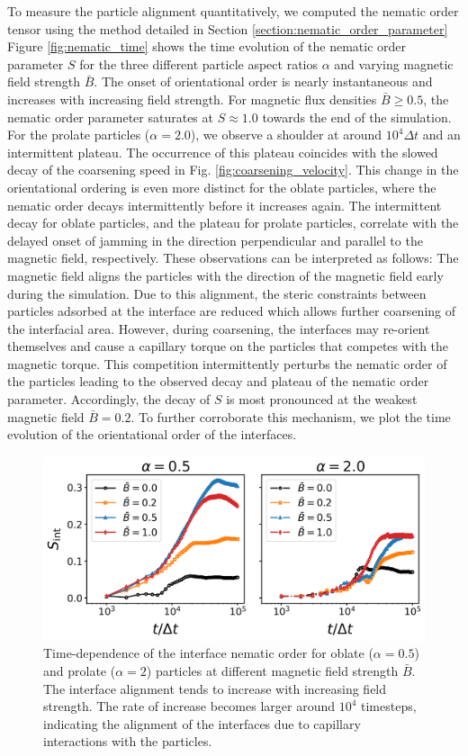 To measure the particle alignment quantitatively, we computed the
nematic order tensor using the method detailed in Section \ref{section:nematic_order_parameter} 
Figure \ref{fig:nematic_time} shows the time evolution of the nematic
order parameter \(S\) for the three different particle aspect ratios
\(\alpha\) and varying magnetic field strength \(\bar{B}\). The onset of
orientational order is nearly instantaneous and increases with
increasing field strength. For magnetic flux densities
\(\bar{B}\ge0.5\), the nematic order parameter saturates at
\(S\approx 1.0\) towards the end of the simulation. For the prolate
particles (\(\alpha=2.0\)), we observe a shoulder at around
\(10^4\Delta t\) and an intermittent plateau. The occurrence of this
plateau coincides with the slowed decay of the coarsening speed in Fig.
\ref{fig:coarsening_velocity}. This change in the orientational ordering
is even more distinct for the oblate particles, where the nematic order
decays intermittently before it increases again. The intermittent decay
for oblate particles, and the plateau for prolate particles, correlate
with the delayed onset of jamming in the direction perpendicular and
parallel to the magnetic field, respectively. These observations can be
interpreted as follows: The magnetic field aligns the particles with the
direction of the magnetic field early during the simulation. Due to this
alignment, the steric constraints between particles adsorbed at the
interface are reduced which allows further coarsening of the interfacial
area. However, during coarsening, the interfaces may re-orient
themselves and cause a capillary torque on the particles that competes
with the magnetic torque. This competition intermittently perturbs the
nematic order of the particles leading to the observed decay and plateau
of the nematic order parameter. Accordingly, the decay of \(S\) is most
pronounced at the weakest magnetic field \(\bar{B}=0.2\). To further corroborate 
this mechanism, we plot the time evolution of the orientational order of the interfaces. 

\begin{figure}
\centering
\includegraphics[scale = 0.4]{figures/results/paper1/interface_nematic.png}
\caption{Time-dependence of the interface nematic order for oblate ($\alpha=0.5$) and prolate ($\alpha=2$) particles at different magnetic field strength $\bar{B}$. The interface alignment tends to increase with increasing field strength. The rate of increase becomes larger around $10^4$ timesteps, indicating the alignment of the interfaces due to capillary interactions with the particles.}
\label{fig:interface_nematic}
\end{figure}

